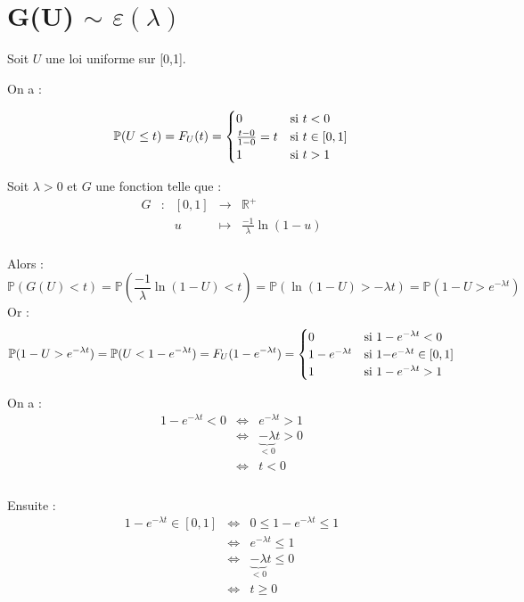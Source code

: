 \documentclass[12,french]{report}
\begin{document}
\chapter{G(U) $\sim$ $\varepsilon(\lambda)$}

Soit $U$ une loi uniforme sur [0,1].

On a :

$$\mathbb{P}(U\leq t)=F_{U}(t)=\begin{cases}
0 & \text{si \ensuremath{t<0} }\\
\frac{t-0}{1-0}=t & \text{si \ensuremath{t}}\in[0,1]\\
1 & \text{si \ensuremath{t>1}}
\end{cases}$$

Soit $\lambda>0$ et $G$ une fonction telle que : \\

$$\begin{array}{ccccc}
	G & : & [0,1] & \longrightarrow & \mathbb{R}^{+} \\
	& & u & \longmapsto & \frac{-1}{\lambda}\ln(1-u) \\
\end{array}$$

Alors : \\
$$\mathbb{P}(G(U)<t)=\mathbb{P}(\frac{-1}{\lambda}\ln(1-U)<t)=\mathbb{P}(\ln(1-U)>-\lambda t)=\mathbb{P}(1-U>e^{-\lambda t})$$
Or :
$$\mathbb{P}(1-U>e^{-\lambda t})=\mathbb{P}(U<1-e^{-\lambda t})=F_{U}(1-e^{-\lambda t})=\begin{cases}
0 & \text{si \ensuremath{1-e^{-\lambda t}<0}}\\
1-e^{-\lambda t} & \text{si \ensuremath{\ensuremath{1}-}\ensuremath{e^{-\lambda t}}}\in[0,1]\\
1 & \text{si \ensuremath{1-e^{-\lambda t}>1}}
\end{cases}$$

On a :
$$\begin{array}{ccl}
	1-e^{-\lambda t}<0 & \iff & e^{-\lambda t}>1 \\
					   & \iff & \underbrace{-\lambda}_{<0}t>0 \\
					   & \iff & t<0 \\
\end{array}$$\\

Ensuite :
$$\begin{array}{ccl}
	1-e^{-\lambda t}\in[0,1] & \iff & 0\leq1-e^{-\lambda t}\leq1 \\
					   & \iff & e^{-\lambda t}\leq1 \\
					   & \iff & \underbrace{-\lambda}_{<0}t\leq0 \\
					   & \iff & t\geq0 \\
\end{array}$$\\
\end{document}
